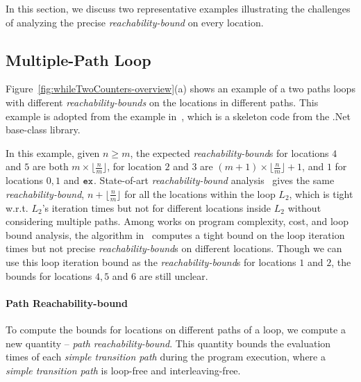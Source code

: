 In this section, we discuss two representative examples illustrating the
challenges of analyzing the precise
\emph{reachability-bound} on
every location.
%
\subsection{Multiple-Path Loop}
\label{sec:overview-multiplepath}

Figure~\ref{fig:whileTwoCounters-overview}(a) shows an example of a two paths loops
with different \emph{reachability-bounds} on the locations in different paths.
This example is adopted from the example in~\cite{GulwaniZ10}, which
is a skeleton code from the .Net base-class library.


In this example, given $n \geq m$,
the expected \emph{reachability-bound}s for locations $4$ and $5$ are both $m \times \lfloor\frac{n}{m}\rfloor$,
for location $2$ and $3$ are $(m + 1) \times \lfloor\frac{n}{m}\rfloor + 1$, 
and $1$ for locations $0, 1$ and $\mathtt{ex}$. 
State-of-art \emph{reachability-bound} analysis~\cite{GulwaniZ10}
gives the same \emph{reachability-bound}, $n + \lfloor\frac{n}{m}\rfloor$ for all the locations within the loop $L_2$, which is tight w.r.t. $L_2$'s iteration times but not for different locations inside $L_2$ without considering multiple paths.
Among works on program complexity, cost, and loop bound analysis, the algorithm in~\cite{GulwaniJK09} computes a tight bound on the loop iteration times but not precise \emph{reachability-bound}s on different locations.
Though we can use this loop iteration bound as the \emph{reachability-bound}s for locations $1$ and $2$,
the bounds for locations $4, 5$ and $6$ are still unclear.


\paragraph{Path Reachability-bound}
To compute the bounds for locations on different paths of a loop, we compute a new quantity -- \emph{path reachability-bound}.
This quantity bounds the evaluation times of each \emph{simple transition path} during the program execution, where a \emph{simple transition path} is loop-free and interleaving-free.

